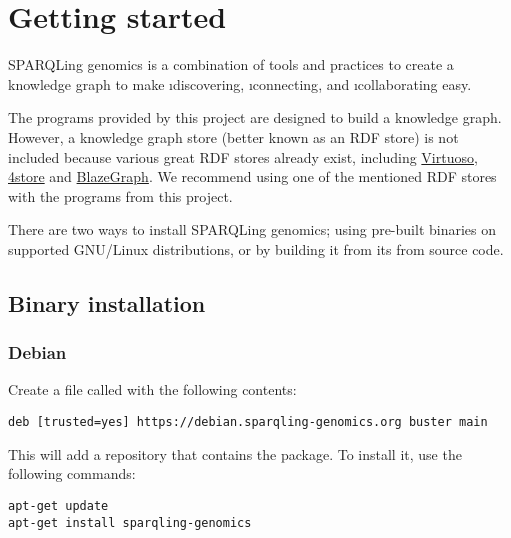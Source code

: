 \chapter{Getting started}

  SPARQLing genomics is a combination of tools and practices to create a
  knowledge graph to make \i{discovering}, \i{connecting}, and
  \i{collaborating} easy.

  The programs provided by this project are designed to build a knowledge graph.
  However, a knowledge graph store (better known as an RDF store) is not included
  because various great RDF stores already exist, including
  \href{https://virtuoso.openlinksw.com/}{Virtuoso},
  \href{https://github.com/4store/4store}{4store} and
  \href{https://www.blazegraph.com/}{BlazeGraph}.  We recommend using one of
  the mentioned RDF stores with the programs from this project.

  There are two ways to install SPARQLing genomics; using pre-built binaries
  on supported GNU/Linux distributions, or by building it from its from source
  code.

\section{Binary installation}
\label{sec:binary-installation}

\subsection{Debian}

  Create a file called 
  with the following contents:

\begin{siderules}
\begin{verbatim}
deb [trusted=yes] https://debian.sparqling-genomics.org buster main
\end{verbatim}
\end{siderules}

  This will add a repository that contains the 
  package.  To install it, use the following commands:

\begin{siderules}
\begin{verbatim}
apt-get update
apt-get install sparqling-genomics
\end{verbatim}
\end{siderules}

